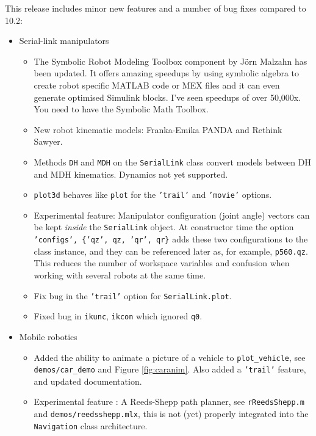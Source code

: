 \documentclass[a4paper,twoside]{report}
\begin{document}
This release includes minor new features and  a number of bug fixes compared to 10.2:
\begin{itemize}
\item Serial-link manipulators
    \begin{itemize}
    \item The Symbolic Robot Modeling Toolbox component by J\"{o}rn Malzahn has been updated.  It offers amazing speedups by using symbolic algebra to create robot specific MATLAB code or MEX files and it can even generate optimised Simulink blocks.  I've seen speedups of over 50,000x.  You need to have the Symbolic Math Toolbox.
    \item New robot kinematic models: Franka-Emika PANDA and Rethink Sawyer.
    \item Methods \texttt{DH} and \texttt{MDH} on the \texttt{SerialLink} class convert models between DH and MDH kinematics. Dynamics not yet supported.
    \item \texttt{plot3d} behaves like \texttt{plot} for the \texttt{'trail'} and \texttt{'movie'} options.
    \item Experimental feature: Manipulator configuration (joint angle) vectors can be kept \textit{inside} the \texttt{SerialLink} object.  At constructor time
    	the option \texttt{'configs', \{'qz', qz, 'qr', qr\}} adds these two configurations to the class instance, and they can be referenced later as, for 	example, \texttt{p560.qz}.  This reduces the number of workspace variables and confusion when working with several robots at the same 	time.
	
\item Fix bug in the \texttt{'trail'} option for \texttt{SerialLink.plot}.

\item Fixed bug in \texttt{ikunc}, \texttt{ikcon} which ignored \texttt{q0}.
    \end{itemize}
\item Mobile robotics
\begin{itemize}
\item Added the ability to animate a picture of a vehicle to \texttt{plot\_vehicle}, see \texttt{demos/car\_demo} and Figure \ref{fig:caranim}.  Also added a \texttt{'trail'} feature, and updated documentation.
	\item Experimental feature : A Reeds-Shepp path planner, see \texttt{rReedsShepp.m} and \texttt{demos/reedsshepp.mlx}, this is not (yet) properly integrated
	into the \texttt{Navigation} class architecture.
\end{itemize}


\end{itemize}
\end{document}
